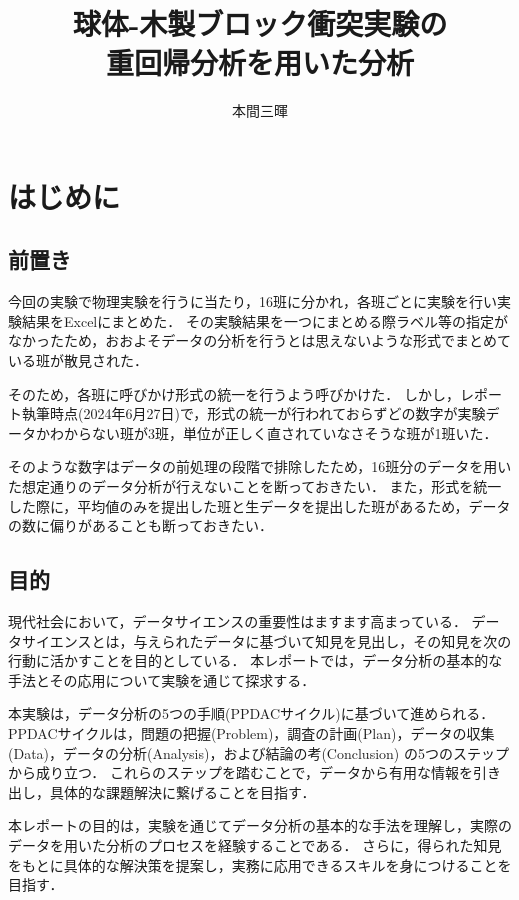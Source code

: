 \documentclass[titlepage,a4paper]{jsarticle}
\title{球体-木製ブロック衝突実験の\\重回帰分析を用いた分析}
\author{本間三暉}
\begin{document}
\maketitle
\section{はじめに}
\subsection{前置き}
今回の実験で物理実験を行うに当たり，16班に分かれ，各班ごとに実験を行い実験結果をExcelにまとめた．
その実験結果を一つにまとめる際ラベル等の指定がなかったため，おおよそデータの分析を行うとは思えないような形式でまとめている班が散見された．

そのため，各班に呼びかけ形式の統一を行うよう呼びかけた．
しかし，レポート執筆時点(2024年6月27日)で，形式の統一が行われておらずどの数字が実験データかわからない班が3班，単位が正しく直されていなさそうな班が1班いた．

そのような数字はデータの前処理の段階で排除したため，16班分のデータを用いた想定通りのデータ分析が行えないことを断っておきたい．
また，形式を統一した際に，平均値のみを提出した班と生データを提出した班があるため，データの数に偏りがあることも断っておきたい．

\subsection{目的}
現代社会において，データサイエンスの重要性はますます高まっている．
データサイエンスとは，与えられたデータに基づいて知見を見出し，その知見を次の行動に活かすことを目的としている．
本レポートでは，データ分析の基本的な手法とその応用について実験を通じて探求する．

本実験は，データ分析の5つの手順(PPDACサイクル)に基づいて進められる．
PPDACサイクルは，問題の把握(Problem)，調査の計画(Plan)，データの収集(Data)，データの分析(Analysis)，および結論の考(Conclusion)
の5つのステップから成り立つ．
これらのステップを踏むことで，データから有用な情報を引き出し，具体的な課題解決に繋げることを目指す．

本レポートの目的は，実験を通じてデータ分析の基本的な手法を理解し，実際のデータを用いた分析のプロセスを経験することである．
さらに，得られた知見をもとに具体的な解決策を提案し，実務に応用できるスキルを身につけることを目指す．
\end{document}
